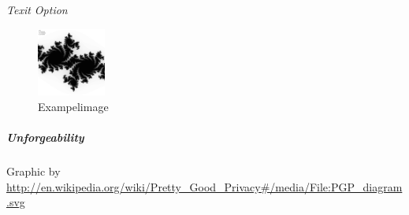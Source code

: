 \textit{Texit Option}

\begin{figure}[h!]
  \centering
      \includegraphics[width=0.2\textwidth]{images/Julia-Fractal.png}
  \caption{Exampelimage}
\end{figure}

\subparagraph{Unforgeability}
\label{subp:subparagraph_name}

Graphic by \url{http://en.wikipedia.org/wiki/Pretty_Good_Privacy#/media/File:PGP_diagram.svg}
